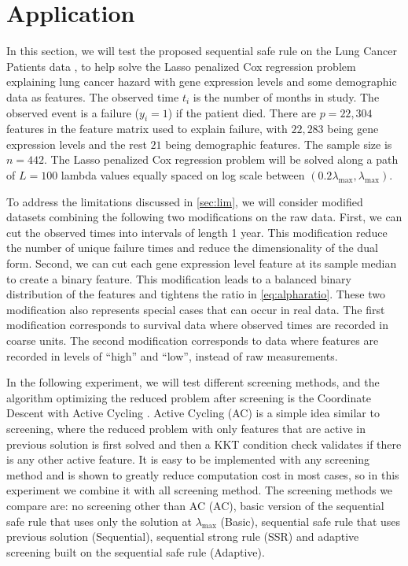 \section{Application}

In this section, we will test the proposed sequential safe rule on the Lung Cancer Patients data \citep{shedden2008gene}, to help solve the Lasso penalized Cox regression problem explaining lung cancer hazard with gene expression levels and some demographic data as features. The observed time $t_i$ is the number of months in study. The observed event is a failure ($y_i=1$) if the patient died. There are $p=22,304$ features in the feature matrix used to explain failure, with $22,283$ being gene expression levels and the rest $21$ being demographic features. The sample size is $n=442$. The Lasso penalized Cox regression problem will be solved along a path of $L=100$ lambda values equally spaced on log scale between $(0.2\lambda_{\max},\lambda_{\max})$. 

To address the limitations discussed in \ref{sec:lim}, we will consider modified datasets combining the following two modifications on the raw data. First, we can cut the observed times into intervals of length 1 year. This modification reduce the number of unique failure times and reduce the dimensionality of the dual form. Second, we can cut each gene expression level feature at its sample median to create a binary feature. This modification leads to a balanced binary distribution of the features and tightens the ratio in \eqref{eq:alpharatio}. These two modification also represents special cases that can occur in real data. The first modification corresponds to survival data where observed times are recorded in coarse units. The second modification corresponds to data where features are recorded in levels of ``high'' and ``low'', instead of raw measurements.

In the following experiment, we will test different screening methods, and the algorithm optimizing the reduced problem after screening is the Coordinate Descent \citep{simon2011regularization} with Active Cycling \citep{lee2007efficient}. Active Cycling (AC) is a simple idea similar to screening, where the reduced problem with only features that are active in previous solution is first solved and then a KKT condition check validates if there is any other active feature. It is easy to be implemented with any screening method and is shown to greatly reduce computation cost in most cases, so in this experiment we combine it with all screening method. The screening methods we compare are: no screening other than AC (AC), basic version of the sequential safe rule that uses only the solution at $\lambda_{\max}$ (Basic), sequential safe rule that uses previous solution (Sequential), sequential strong rule (SSR) and adaptive screening built on the sequential safe rule (Adaptive).

